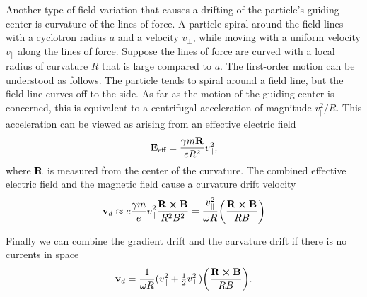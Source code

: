 \documentclass[10pt]{article}
\begin{document}
Another type of field variation that causes a drifting of the particle's guiding center is curvature of the lines of force. A particle spiral around the field lines with a cyclotron radius $a$ and a velocity $v_{\perp}$, while moving with a uniform velocity $v_{\parallel}$ along the lines of force. Suppose the lines of force are curved with a local radius of curvature $R$ that is large compared to $a$. The first-order motion can be understood as follows. The particle tends to spiral around a field line, but the field line curves off to the side. As far as the motion of the guiding center is concerned, this is equivalent to a centrifugal acceleration of magnitude $v_{\parallel}^2/R$. This acceleration can be viewed as arising from an effective electric field
\begin{equation}
	\vb{E}_{\text{eff}} = \frac{\gamma m \vb{R}}{e R^2} v_{\parallel}^2,
\end{equation}
where $\vb{R}$ is measured from the center of the curvature. The combined effective electric field and the magnetic field cause a curvature drift velocity
\begin{equation}
	\vb{v}_d \approx c \frac{\gamma m}{e} v_{\parallel}^2 \frac{\vb{R} \cross \vb{B}}{R^2 B^2} = \frac{v_{\parallel}^2}{\omega R} \qty(\frac{\vb{R} \cross \vb{B}}{RB})
\end{equation}

Finally we can combine the gradient drift and the curvature drift if there is no currents in space
\begin{equation}
	\vb{v}_d = \frac{1}{\omega R} (v_{\parallel}^2 + \tfrac{1}{2}v_{\perp}^2)\qty(\frac{\vb{R} \cross \vb{B}}{RB}).
\end{equation}
\end{document}

